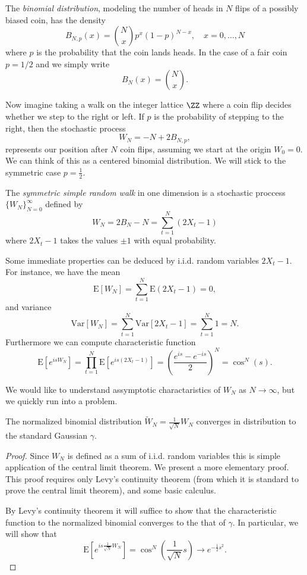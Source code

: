 \begin{definition}
  The \emph{binomial distribution}, modeling the number of heads in $N$ flips of a possibly biased coin, has the density
  \[
    B_{N, p}(x) = \binom{N}{x} p^x(1 - p)^{N - x}, \quad x = 0, \ldots, N
  \]
  where $p$ is the probability that the coin lands heads. In the case of a fair coin $p = 1/2$ and we simply write
  \[
    B_N(x) = \binom{N}{x}.
  \]
\end{definition}

Now imagine taking a walk on the integer lattice $\ZZ$ where a coin flip decides whether we step to the right or left. If $p$ is the probability of stepping to the right, then the stochastic process
\[
  W_N 
  = -N + 2B_{N, p},
\]
represents our position after $N$ coin flips, assuming we start at the origin $W_0 = 0$. We can think of this as a centered binomial distribution. We will stick to the symmetric case $p = \frac12$.

\begin{definition}
  The \emph{symmetric simple random walk} in one dimension is a stochastic proccess $\{W_N\}_{N = 0}^\infty$ defined by
  \[
    W_N = 2B_{N} - N = \sum_{t = 1}^N (2X_t - 1)
  \]
  where $2X_t - 1$ takes the values $\pm 1$ with equal probability.
\end{definition}

Some immediate properties can be deduced by i.i.d. random variables $2X_t - 1$. For instance, we have the mean
\[
  \mathrm{E}[W_N] = \sum_{t = 1}^N \mathrm{E}(2X_t - 1) = 0,
\]
and variance
\[
  \mathrm{Var}[W_N] = \sum_{t = 1}^N \mathrm{Var}[2X_t - 1] = \sum_{t = 1}^N 1 = N.
\]
Furthermore we can compute characteristic function
\[
  \mathrm{E}[e^{isW_N}] = \prod_{t = 1}^N \mathrm{E}[e^{is(2X_t - 1)}] = \left(\frac{e^{is} - e^{-is}}2\right)^N = \cos^N(s).
\]

We would like to understand assymptotic charactaristics of $W_N$ as $N \to \infty$, but we quickly run into a problem. 


\begin{proposition}
  The normalized binomial distribution $\tilde{W}_N = \frac1{\sqrt{N}}W_N$ converges in distribution to the standard Gaussian $\gamma$.
\end{proposition}

\begin{proof}
  Since $W_N$ is defined as a sum of i.i.d. random variables this is simple application of the central limit theorem. We present a more elementary proof. This proof requires only Levy's continuity theorem (from which it is standard to prove the central limit theorem), and some basic calculus.

  By Levy's continuity theorem it will suffice to show that the characteristic function to the normalized binomial converges to the that of $\gamma$. In particular, we will show that 
  \[
    \mathrm{E}[e^{is\frac1{\sqrt{N}}W_N}] = \cos^N(\frac1{\sqrt{N}}s) \to e^{-\frac12 s^2}.
  \]
\end{proof}

